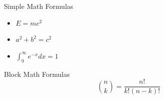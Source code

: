\documentclass[aspectratio=169,12pt]{beamer}
\begin{document}
\begin{frame}{Simple Math Formulas}

\begin{itemize}
 \item $E=mc^2$
 \item $a^2 + b^2 = c^2$
 \item $\int_0^\infty e^{-x} dx = 1$
\end{itemize}
\end{frame}

\begin{frame}{Block Math Formulas}
\[
\binom{n}{k} = \frac{n!}{k!(n-k)!}
\]
\end{frame}
\end{document}
